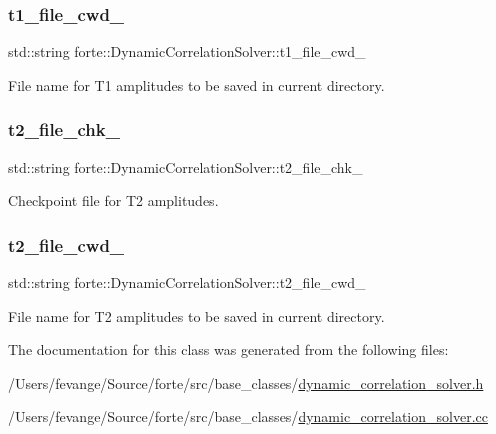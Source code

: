 \subsubsection{\texorpdfstring{t1\+\_\+file\+\_\+cwd\+\_\+}{t1\_file\_cwd\_}}
{\footnotesize\ttfamily std\+::string forte\+::\+Dynamic\+Correlation\+Solver\+::t1\+\_\+file\+\_\+cwd\+\_\+\hspace{0.3cm}{\ttfamily [protected]}}



File name for T1 amplitudes to be saved in current directory. 

\mbox{\label{classforte_1_1_dynamic_correlation_solver_aef52805c0fd6b82f19ea598cec8f3fc6}} 
\subsubsection{\texorpdfstring{t2\+\_\+file\+\_\+chk\+\_\+}{t2\_file\_chk\_}}
{\footnotesize\ttfamily std\+::string forte\+::\+Dynamic\+Correlation\+Solver\+::t2\+\_\+file\+\_\+chk\+\_\+\hspace{0.3cm}{\ttfamily [protected]}}



Checkpoint file for T2 amplitudes. 

\mbox{\label{classforte_1_1_dynamic_correlation_solver_aeffaac4dffe7b8a38b625f466edb8781}} 
\subsubsection{\texorpdfstring{t2\+\_\+file\+\_\+cwd\+\_\+}{t2\_file\_cwd\_}}
{\footnotesize\ttfamily std\+::string forte\+::\+Dynamic\+Correlation\+Solver\+::t2\+\_\+file\+\_\+cwd\+\_\+\hspace{0.3cm}{\ttfamily [protected]}}



File name for T2 amplitudes to be saved in current directory. 



The documentation for this class was generated from the following files\+:\begin{DoxyCompactItemize}
\item 
/\+Users/fevange/\+Source/forte/src/base\+\_\+classes/\mbox{\hyperlink{dynamic__correlation__solver_8h}{dynamic\+\_\+correlation\+\_\+solver.\+h}}\item 
/\+Users/fevange/\+Source/forte/src/base\+\_\+classes/\mbox{\hyperlink{dynamic__correlation__solver_8cc}{dynamic\+\_\+correlation\+\_\+solver.\+cc}}\end{DoxyCompactItemize}
